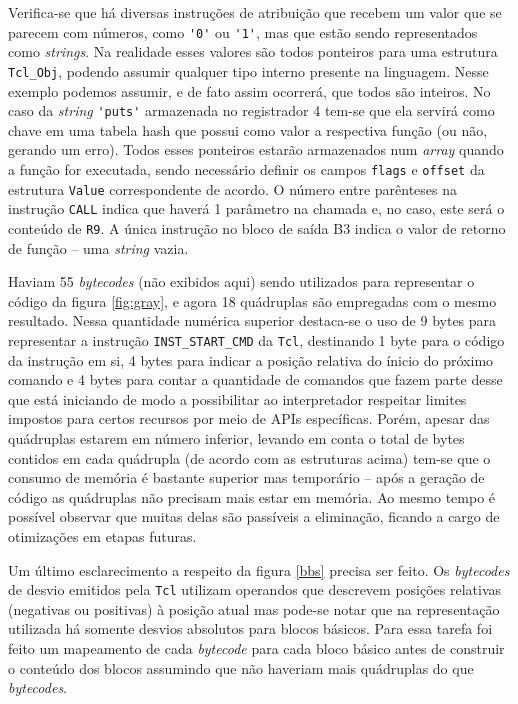 Verifica-se que há diversas instruções de atribuição que recebem um
valor que se parecem com números, como \verb!'0'! ou \verb!'1'!, mas
que estão sendo representados como \textit{strings}. Na realidade esses valores
são todos ponteiros para uma estrutura \verb!Tcl_Obj!, podendo assumir
qualquer tipo interno presente na linguagem. Nesse exemplo podemos
assumir, e de fato assim ocorrerá, que todos são inteiros. No caso da
\textit{string} \verb!'puts'! armazenada no registrador 4 tem-se que ela
servirá como chave em uma tabela hash que possui como valor a
respectiva função (ou não, gerando um erro). Todos esses ponteiros
estarão armazenados num \textit{array} quando a função for executada,
sendo necessário definir os campos \verb!flags! e \verb!offset! da
estrutura \verb!Value! correspondente de acordo.
O número entre parênteses na instrução \verb!CALL!
indica que haverá 1 parâmetro na chamada e, no caso, este será o
conteúdo de \verb!R9!. A única instrução no bloco de saída B3 indica o
valor de retorno de função -- uma \textit{string} vazia.

Haviam 55 \textit{bytecodes} (não exibidos aqui) sendo utilizados para
representar o código da figura \ref{fig:gray}, e agora 18 quádruplas
são empregadas com o mesmo resultado. Nessa quantidade numérica
superior destaca-se o uso de 9 bytes para representar a instrução
\verb!INST_START_CMD! da \texttt{Tcl}, destinando 1 byte para o código
da instrução em si, 4 bytes para indicar a posição relativa do ínicio
do próximo comando e
4 bytes para contar a quantidade de comandos que fazem parte desse que
está iniciando de modo a possibilitar ao  interpretador respeitar
limites impostos para certos recursos por meio de
APIs específicas. Porém, apesar das quádruplas estarem em número inferior,
levando em conta o total de bytes contidos em cada quádrupla (de
acordo com as estruturas acima) tem-se que
o consumo de memória é bastante superior mas temporário -- após
a geração de código as quádruplas não precisam mais estar em memória.
Ao mesmo tempo é possível observar que muitas delas são passíveis a
eliminação, ficando a cargo de otimizações em etapas futuras.

Um último esclarecimento a respeito da figura \ref{bbs} precisa ser feito.
Os \textit{bytecodes} de desvio emitidos pela \texttt{Tcl} utilizam
operandos que descrevem posições relativas (negativas ou positivas) à
posição atual mas pode-se notar que na
representação utilizada há somente desvios absolutos para blocos
básicos. Para essa tarefa foi feito um mapeamento de cada
\textit{bytecode} para cada bloco básico antes de construir o
conteúdo dos blocos assumindo que não haveriam mais quádruplas do que
\textit{bytecodes}.

